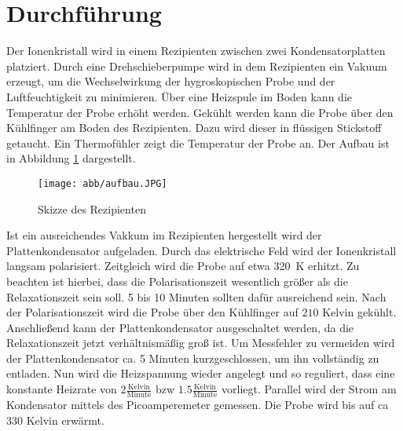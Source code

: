 \section{Durchführung}
\label{sec:Durchführung}

Der Ionenkristall wird in einem Rezipienten zwischen zwei Kondensatorplatten platziert.
Durch eine Drehschieberpumpe wird in dem Rezipienten ein Vakuum erzeugt,
um die Wechselwirkung der hygroskopischen Probe und der Luftfeuchtigkeit zu minimieren.
Über eine Heizspule im Boden kann die Temperatur der Probe erhöht werden.
Gekühlt werden kann die Probe über den Kühlfinger am Boden des Rezipienten.
Dazu wird dieser in flüssigen Stickstoff getaucht.
Ein Thermofühler zeigt die Temperatur der Probe an.
Der Aufbau ist in Abbildung \ref{abb:aufbau} dargestellt.
\begin{figure}[h] 
    \centering
    \texttt{[image: abb/aufbau.JPG]}
    \caption{Skizze des Rezipienten \cite{sample}}
    \label{abb:aufbau}
\end{figure}
Ist ein ausreichendes Vakkum im Rezipienten hergestellt wird der Plattenkondensator aufgeladen.
Durch das elektrische Feld wird der Ionenkristall langsam polarisiert. Zeitgleich wird die
Probe auf etwa \SI{320}{\kelvin} erhitzt.
Zu beachten ist hierbei, dass die Polarisationszeit wesentlich größer als die Relaxationszeit sein soll.
5 bis 10 Minuten sollten dafür ausreichend sein.
Nach der Polarisationszeit wird die Probe über den Kühlfinger auf $210$ Kelvin gekühlt.
Anschließend kann der Plattenkondensator ausgeschaltet werden,
da die Relaxationszeit jetzt verhältnismäßig groß ist.
Um Messfehler zu vermeiden wird der Plattenkondensator ca. 5 Minuten kurzgeschlossen, 
um ihn vollständig zu entladen.
Nun wird die Heizspannung wieder angelegt und so reguliert,
dass eine konstante Heizrate von $2 \frac{\text{Kelvin}}{\text{Minute}}$ bzw $1.5 \frac{\text{Kelvin}}{\text{Minute}}$ vorliegt.
Parallel wird der Strom am Kondensator mittels des Picoamperemeter gemessen.
Die Probe wird bis auf ca $330$ Kelvin erwärmt.
